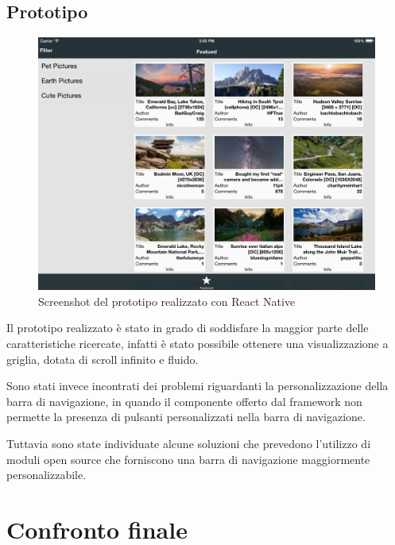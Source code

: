 \subsection{Prototipo}

\begin{figure}[htp]
\centering
\includegraphics[width=\textwidth]{../immagini/prototipo-react-native}
\caption{Screenshot del prototipo realizzato con React Native}  
\end{figure}

Il prototipo realizzato è stato in grado di soddisfare la maggior parte delle caratteristiche ricercate, infatti è stato possibile ottenere una visualizzazione a griglia, dotata di scroll infinito e fluido.

Sono stati invece incontrati dei problemi riguardanti la personalizzazione della barra di navigazione, in quando il componente offerto dal framework non permette la presenza di pulsanti personalizzati nella barra di navigazione.

Tuttavia sono state individuate alcune soluzioni che prevedono l'utilizzo di moduli open source che forniscono una barra di navigazione maggiormente personalizzabile.

\FloatBarrier
\section{Confronto finale}

